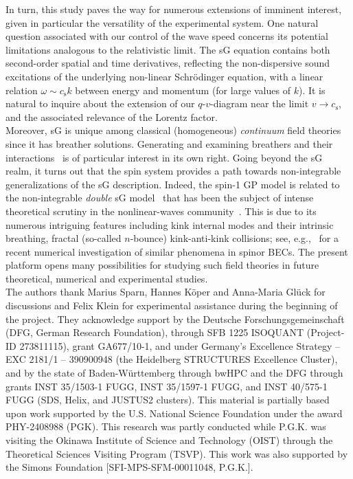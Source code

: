 \documentclass[aps,

               pra,
               twocolumn,
               amsmath,
               amssymb,
               superscriptaddress,
               reprint,
               10pt
              ]{revtex4-2}
\begin{document}
In turn, this study paves the way for numerous extensions of imminent interest, given in particular the versatility of the experimental system.
One natural question associated with our control of the wave speed concerns its potential limitations analogous to the relativistic limit.
The sG equation contains both second-order spatial and time derivatives, reflecting the non-dispersive sound excitations of the underlying non-linear Schr\"{o}dinger equation, with a linear relation $\omega\sim c_\mathrm{s} k$ between energy and momentum (for large values of $k$).
It is natural to inquire about the extension of our $q$-$v$-diagram near the limit $v\to c_\mathrm{s}$, and the associated relevance of the Lorentz factor.\\
Moreover, sG is unique among classical (homogeneous)
{\it continuum} field theories~\cite{BMW94} since it has breather solutions.
Generating and examining breathers and their interactions~\cite{hiroshima}
is of particular interest in its own right.
Going beyond the sG realm, it turns out that the spin system provides
a path towards non-integrable generalizations
of the sG description. Indeed, the spin-1 GP model
is related to the non-integrable {\it double} sG model~\cite{Siovitz2025}
that has been the subject of intense theoretical scrutiny in the nonlinear-waves community~\cite{Campbell1986}. This is due to its numerous
intriguing features including kink internal modes and their
intrinsic breathing, fractal (so-called $n$-bounce)
kink-anti-kink collisions; see, e.g.,~\cite{Bai2025} for a recent numerical investigation of similar phenomena in spinor BECs.
The present platform opens many possibilities for studying such field theories in future theoretical, numerical and
experimental studies.\\








The authors thank Marius Sparn, Hannes K{\"o}per and Anna-Maria Gl{\"u}ck for discussions and Felix Klein for experimental assistance during the beginning of the project.
They acknowledge support
by the Deutsche Forschungsgemeinschaft (DFG, German Research Foundation), through
SFB 1225 ISOQUANT (Project-ID 273811115),
grant GA677/10-1,
and under Germany's Excellence Strategy -- EXC 2181/1 -- 390900948 (the Heidelberg STRUCTURES Excellence Cluster),
and by the state of Baden-W{\"u}rttemberg through bwHPC and the DFG through
grants
INST 35/1503-1 FUGG, INST 35/1597-1 FUGG, and INST 40/575-1 FUGG
(SDS, Helix, and JUSTUS2 clusters).
This material is partially based upon work supported by the U.S. National Science Foundation under the award PHY-2408988 (PGK). This research was partly conducted while P.G.K. was
visiting the Okinawa Institute of Science and
Technology (OIST) through the Theoretical Sciences Visiting Program (TSVP).
This work was also supported by the Simons Foundation
[SFI-MPS-SFM-00011048, P.G.K.].
\end{document}

